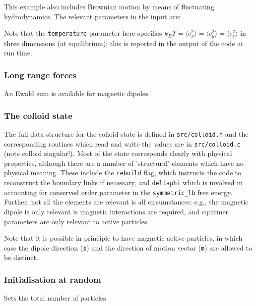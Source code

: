 This example also includes Brownian motion by means of fluctuating
hydrodynamics. The relevant parameters in the input are:



Note that the \texttt{temperature} parameter here specifies
$k_BT = \langle c_x^2\rangle = \langle c_y^2 \rangle = \langle c_z^2 \rangle$
in three dimensions (at equilibrium);
this is reported in the output of the code at run time.

\subsubsection{Long range forces}

An Ewald sum is available for magnetic dipoles.

\subsubsection{The colloid state}

The full data structure for the colloid state is defined in
\texttt{src/colloid.h} and the corresponding routines which read
and write the values are in \texttt{src/colloid.c}
(note colloid singular!). Most of the state corresponds clearly
with physical properties, although there are a number of 'structural'
elements which have no physical meaning. These include the
\texttt{rebuild} flag, which instructs the code to reconstruct the
boundary links if necessary, and \texttt{deltaphi} which is involved
in accounting for conserved order parameter in the \texttt{symmetric\_lb}
free energy. Further, not all the elements are relevant is all
circumstances: e.g., the magnetic dipole is only relevant is magnetic
interactions are required, and squirmer parameters are only relevant
to active particles.

Note that it is possible in principle to have magnetic active particles,
in which case the dipole direction (\texttt{s}) and the direction of
motion vector (\texttt{m}) are allowed to be distinct.

\subsubsection{Initialisation at random}

 Sets the total number of particles


